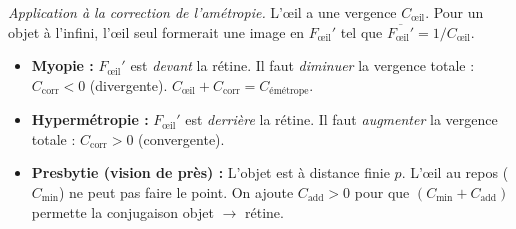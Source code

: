 \documentclass[11pt]{article}
\begin{document}
\emph{Application à la correction de l'amétropie.}
L'œil a une vergence $C_{\text{œil}}$. Pour un objet à l'infini, l'œil seul formerait une image en $F_{\text{œil}}'$ tel que $\overline{F_{\text{œil}}'} = 1/C_{\text{œil}}$.
\begin{itemize}
    \item \textbf{Myopie :} $F_{\text{œil}}'$ est \emph{devant} la rétine. Il faut \emph{diminuer} la vergence totale : $C_{\text{corr}} < 0$ (divergente). $C_{\text{œil}} + C_{\text{corr}} = C_{\text{émétrope}}$.
    \item \textbf{Hypermétropie :} $F_{\text{œil}}'$ est \emph{derrière} la rétine. Il faut \emph{augmenter} la vergence totale : $C_{\text{corr}} > 0$ (convergente).
    \item \textbf{Presbytie (vision de près) :} L'objet est à distance finie $p$. L'œil au repos ($C_{\text{min}}$) ne peut pas faire le point. On ajoute $C_{\text{add}} > 0$ pour que $(C_{\text{min}} + C_{\text{add}})$ permette la conjugaison objet $\to$ rétine.
\end{itemize}
\end{document}
